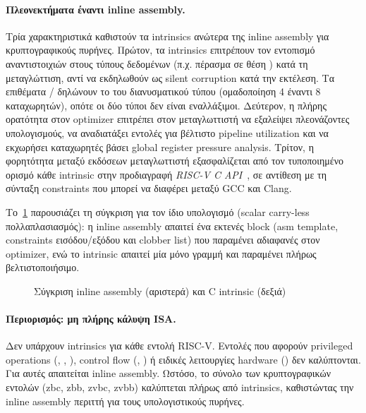 \paragraph{Πλεονεκτήματα έναντι inline assembly.}
Τρία χαρακτηριστικά καθιστούν τα intrinsics ανώτερα της inline assembly
για κρυπτογραφικούς πυρήνες. Πρώτον, τα intrinsics επιτρέπουν τον εντοπισμό
αναντιστοιχιών στους τύπους δεδομένων (π.χ. πέρασμα  σε
θέση ) κατά τη μεταγλώττιση, αντί να εκδηλωθούν ως
silent corruption κατά την εκτέλεση. Τα επιθέματα /
δηλώνουν το \LMUL του διανυσματικού τύπου (ομαδοποίηση \num{4} έναντι
\num{8} καταχωρητών), οπότε οι δύο τύποι δεν είναι εναλλάξιμοι. Δεύτερον, η
πλήρης ορατότητα στον optimizer επιτρέπει στον μεταγλωττιστή να εξαλείψει
πλεονάζοντες υπολογισμούς, να αναδιατάξει εντολές για βέλτιστο pipeline
utilization και να εκχωρήσει καταχωρητές βάσει global register pressure
analysis. Τρίτον, η φορητότητα μεταξύ εκδόσεων μεταγλωττιστή εξασφαλίζεται
από τον τυποποιημένο ορισμό κάθε intrinsic στην προδιαγραφή \emph{RISC-V C
API}~\autocite{RISCV-c-api}, σε αντίθεση με τη σύνταξη constraints που μπορεί
να διαφέρει μεταξύ GCC και Clang.

Το~\cref{fig:inline-vs-intrinsic} παρουσιάζει τη σύγκριση για τον ίδιο
υπολογισμό (scalar carry-less πολλαπλασιασμός): η inline assembly απαιτεί ένα
εκτενές block (asm template, constraints εισόδου/εξόδου και clobber list)
που παραμένει αδιαφανές στον optimizer, ενώ το intrinsic απαιτεί μία μόνο
γραμμή και παραμένει πλήρως βελτιστοποιήσιμο.

\begin{figure}[htbp]
  \centering
  
  \caption{Σύγκριση inline assembly (αριστερά) και C intrinsic (δεξιά)}
  \label{fig:inline-vs-intrinsic}
\end{figure}

\paragraph{Περιορισμός: μη πλήρης κάλυψη ISA.}
Δεν υπάρχουν intrinsics για κάθε εντολή RISC-V. Εντολές που αφορούν
privileged operations (, , ), control
flow (, ) ή ειδικές λειτουργίες hardware
() δεν καλύπτονται. Για αυτές απαιτείται inline assembly.
Ωστόσο, το σύνολο των κρυπτογραφικών εντολών (\gls{zbc}, \gls{zbb}, \gls{zvbc}, \gls{zvbb})
καλύπτεται πλήρως από intrinsics, καθιστώντας την inline assembly περιττή
για τους υπολογιστικούς πυρήνες.

